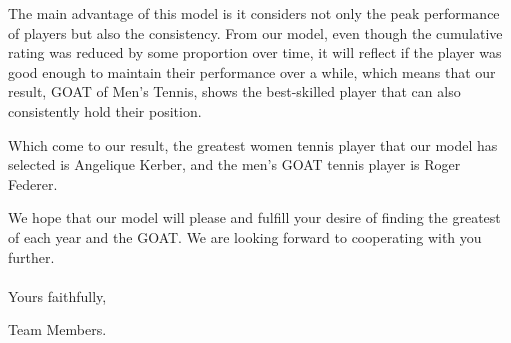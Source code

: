 The main advantage of this model is it considers not only the peak performance of players but also the consistency. From our model, even though the cumulative rating was reduced by some proportion over time, it will reflect if the player was good enough to maintain their performance over a while, which means that our result, GOAT of Men’s Tennis, shows the best-skilled player that can also consistently hold their position. 

Which come to our result, the greatest women tennis player that our model has selected is Angelique Kerber, and the men’s GOAT tennis player is Roger Federer. 

We hope that our model will please and fulfill your desire of finding the greatest of each year and the GOAT. We are looking forward to cooperating with you further. 
\\
\\
\noindent Yours faithfully,

\noindent Team Members.  %